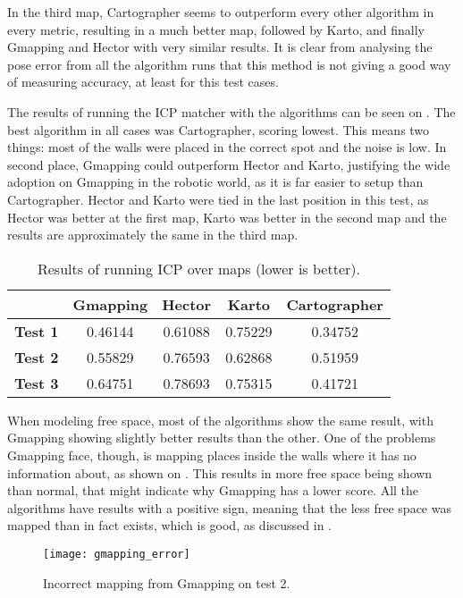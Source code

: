 In the third map, Cartographer seems to outperform every other algorithm in every metric, resulting in a much better map, followed by Karto, and finally Gmapping and Hector with very similar results. It is clear from analysing the pose error from all the algorithm runs that this method is not giving a good way of measuring accuracy, at least for this test cases.

The results of running the ICP matcher with the algorithms can be seen on . The best algorithm in all cases was Cartographer, scoring lowest. This means two things: most of the walls were placed in the correct spot and the noise is low. In second place, Gmapping could outperform Hector and Karto, justifying the wide adoption on Gmapping in the robotic world, as it is far easier to setup than Cartographer. Hector and Karto were tied in the last position in this test, as Hector was better at the first map, Karto was better in the second map and the results are approximately the same in the third map.

\begin{table}[!ht]
\centering
\renewcommand*{\arraystretch}{1.1}
\begin{tabular}{c|c|c|c|c}
& \textbf{Gmapping} & \textbf{Hector} & \textbf{Karto} & \textbf{Cartographer} \\ \hline
\textbf{Test 1} & 0.46144 & 0.61088 & 0.75229 & 0.34752 \\
\textbf{Test 2} & 0.55829 & 0.76593 & 0.62868 & 0.51959 \\
\textbf{Test 3} & 0.64751 & 0.78693 & 0.75315 & 0.41721 \\
 \hline
\end{tabular}
\caption{Results of running ICP over maps (lower is better).}
\label{tab:results_icp}
\end{table}

When modeling free space, most of the algorithms show the same result, with Gmapping showing slightly better results than the other. One of the problems Gmapping face, though, is mapping places inside the walls where it has no information about, as shown on . This results in more free space being shown than normal, that might indicate why Gmapping has a lower score. All the algorithms have results with a positive sign, meaning that the less free space was mapped than in fact exists, which is good, as discussed in .

\begin{figure}[!ht]
     \centering
     \texttt{[image: gmapping\_error]}
     \caption{Incorrect mapping from Gmapping on test 2.}
     \label{fig:gmapping_error}
\end{figure}

